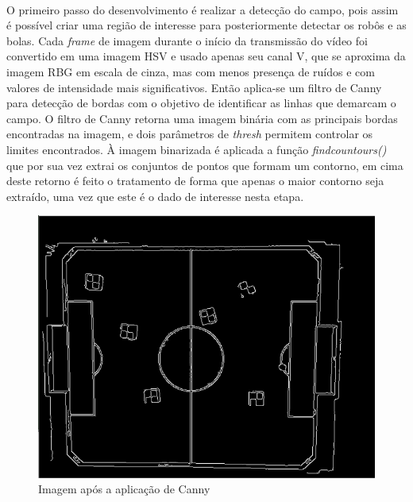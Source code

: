 \documentclass[conference, harvard, brazil, english]{sbatex}
\begin{document}
		\paragraph{}
		O primeiro passo do desenvolvimento é realizar a detecção do campo, pois assim é possível criar uma região de interesse para posteriormente detectar os robôs e as bolas. Cada \textit{frame} de imagem durante o início da transmissão do vídeo foi convertido em uma imagem HSV e usado apenas seu canal V, que se aproxima da imagem RBG em escala de cinza, mas com menos presença de ruídos e com valores de intensidade mais significativos. Então aplica-se um filtro de Canny para detecção de bordas com o objetivo de identificar as linhas que demarcam o campo. O filtro de Canny retorna uma imagem binária com as principais bordas encontradas na imagem, e dois parâmetros de \textit{thresh} permitem controlar os limites encontrados. À imagem binarizada é aplicada a função \textit{findcountours()} que por sua vez extrai os conjuntos de pontos que formam um contorno, em cima deste retorno é feito o tratamento de forma que apenas o maior contorno seja extraído, uma vez que este é o dado de interesse nesta etapa.
		\begin{figure}[h]
			\centering
			\includegraphics[scale=0.3]{canny}
			\caption{Imagem após a aplicação de Canny}
		\end{figure}
\end{document}
